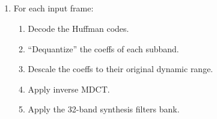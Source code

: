 \subsection{}
\begin{enumerate}
\item For each input frame:
  \begin{enumerate}
  \item Decode the Huffman codes.
   \item ``Dequantize'' the coeffs of each subband.
   \item Descale the coeffs to their original dynamic range.
   \item Apply inverse MDCT.
   \item Apply the 32-band synthesis filters bank.
  \end{enumerate}
\end{enumerate}


